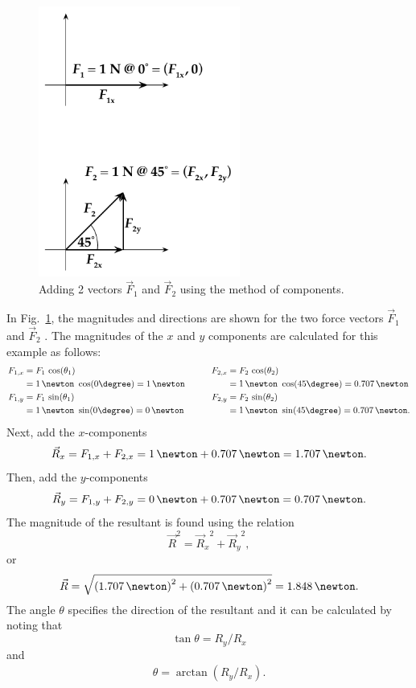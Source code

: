 \begin{figure}%
  \begin{center}
    \includegraphics[width=2.6in]{Experiment01Figures/Figure03.pdf}
  \end{center}
  \caption{Adding 2 vectors $\vec{F}_1$ and $\vec{F}_2$ using the method of components. }
  \label{M01Fig03}
\end{figure}

In Fig.~\ref{M01Fig03}, the magnitudes and directions are shown for the two force vectors $\vec{F}_1$ and $\vec{F}_2$ . The magnitudes of the $x$ and $y$ components are calculated for this example as follows:
\begin{equation}
  \begin{aligned} %
    F_{1,x} & = F_1 \, \cos(\theta_{1}) & \qquad F_{2,x} & = F_2 \, \cos(\theta_{2}) \\
            & = 1\,\newton\ \cos(0\degree) = 1\,\newton & &  = 1\,\newton\ \cos(45\degree) = 0.707\,\newton \\
    F_{1,y} & = F_1 \,\sin(\theta_1) & \qquad F_{2,y} & = F_2 \,\sin(\theta_2) \\
            & = 1\,\newton\ \sin(0\degree) = 0\,\newton & &  = 1\,\newton\ \sin(45\degree) = 0.707\,\newton.
  \end{aligned}
\end{equation}
Next, add the $x$-components
\[
  \vec{R}_x = F_{1,x} + F_{2,x} = 1\,\newton + 0.707\,\newton = 1.707\,\newton.
\]
Then, add the $y$-components
\[
  \vec{R}_y = F_{1,y} + F_{2,y} = 0\,\newton + 0.707\,\newton = 0.707\,\newton.
\]
The magnitude of the resultant is found using the relation
\begin{equation}
	\vec{R}^2 = {\vec{R}_x}^2 + {\vec{R}_y}^2,
\end{equation}
or
\[
  \vec{R} = \sqrt{\left(1.707\,\newton\right)^2 +
    \left(0.707\,\newton\right)^2} = 1.848\,\newton.
\]
The angle $\theta$ specifies the direction of the resultant and it can be calculated by noting that
\begin{equation}
  \tan\theta = R_{y} / R_{x}
\end{equation}
and
\begin{align} %
  \theta = \arctan (R_{y} / R_{x}).
\end{align}

